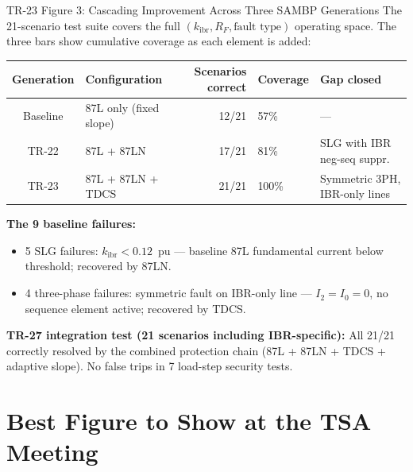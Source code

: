 \documentclass[12pt,a4paper]{article}
\newcommand{\kibr}{k_\mathrm{ibr}}
\begin{document}
\begin{resultbox}{TR-23 Figure 3: Cascading Improvement Across Three SAMBP Generations}
The 21-scenario test suite covers the full $(\kibr, R_F, \text{fault type})$ operating space. The three bars show cumulative coverage as each element is added:

\medskip
\begin{center}
\begin{tabular}{@{}clrll@{}}
\toprule
\textbf{Generation} & \textbf{Configuration} & \textbf{Scenarios correct} & \textbf{Coverage} & \textbf{Gap closed} \\
\midrule
Baseline & 87L only (fixed slope)  & 12/21 & 57\% & --- \\
TR-22    & 87L + 87LN              & 17/21 & 81\% & SLG with IBR neg-seq suppr. \\
TR-23    & 87L + 87LN + TDCS       & 21/21 & 100\% & Symmetric 3PH, IBR-only lines \\
\bottomrule
\end{tabular}
\end{center}

\medskip
\textbf{The 9 baseline failures:}
\begin{itemize}[nosep]
  \item 5 SLG failures: $\kibr < 0.12$~pu --- baseline 87L fundamental current below threshold; recovered by 87LN.
  \item 4 three-phase failures: symmetric fault on IBR-only line --- $I_2 = I_0 = 0$, no sequence element active; recovered by TDCS.
\end{itemize}

\textbf{TR-27 integration test (21 scenarios including IBR-specific):} All 21/21 correctly resolved by the combined protection chain (87L + 87LN + TDCS + adaptive slope). No false trips in 7 load-step security tests.
\end{resultbox}

\section{Best Figure to Show at the TSA Meeting}
\end{document}
